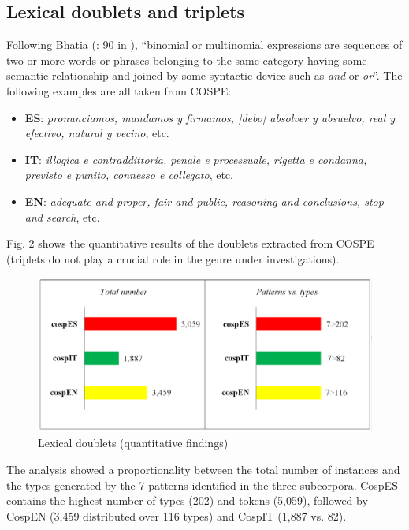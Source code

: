\documentclass[output=paper]{LSP/langsci}
\begin{document}
\subsection{Lexical doublets and triplets}
Following Bhatia (\citeyear{Bhatia1984}: 90 in \citealt[108]{Bhatia1993}), “binomial or multinomial expressions are sequences of two or more words or phrases belonging to the same category having some semantic relationship and joined by some syntactic device such as \textit{and} or \textit{or}”. The following examples are all taken from COSPE:

\begin{itemize}
\item \textbf{ES}: \textit{pronunciamos, mandamos y firmamos, [debo] absolver y absuelvo, real y efectivo, natural y vecino}, etc.
\item \textbf{IT}: \textit{illogica e contraddittoria, penale e processuale, rigetta e condanna, previsto e punito, connesso e collegato}, etc.
\item \textbf{EN}: \textit{adequate and proper, fair and public, reasoning and conclusions, stop and search}, etc.
\end{itemize}

Fig. 2 shows the quantitative results of the doublets extracted from COSPE (triplets do not play a crucial role in the genre under investigations).

\begin{figure}
\includegraphics[width=1.0\textwidth]{./figures/1-2.png}
\caption{Lexical doublets (quantitative findings)}
\end{figure}

The analysis showed a proportionality between the total number of instances and the types generated by the 7 patterns identified in the three subcorpora. CospES contains the highest number of types (202) and tokens (5,059), followed by CospEN (3,459 distributed over 116 types) and CospIT (1,887 vs. 82).
\end{document}
